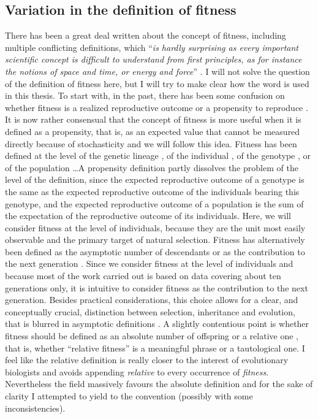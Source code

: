 \subsection{Variation in the definition of fitness}
There has been a great deal written about the concept of fitness, including multiple conflicting definitions, which ``\emph{is hardly surprising as every important scientific concept is difficult to understand from first principles, as for instance the notions of space and time, or energy and force}'' \parencite[p. 1358][]{Wagner2010}. I will not solve the question of the definition of fitness here, but I will try to make clear how the word is used in this thesis. To start with, in the past, there has been some confusion on whether fitness is a realized reproductive outcome or a propensity to reproduce \parencite{Brandon1984}. It is now rather consensual that the concept of fitness is more useful when it is defined as a propensity, that is, as an expected value that cannot be measured directly because of stochasticity \parencite{Brandon1984,Price1996,Krimbas2004} and we will follow this idea. Fitness has been defined at the level of the genetic lineage \parencite[e.g.][]{Akc2016}, of the individual \parencite[e.g.][]{Cam2000}, of the genotype \parencite[e.g.][]{Steiner2012}, or of the population \parencite[e.g.][]{vanTienderen2000}\dots A propensity definition partly dissolves the problem of the level of the definition, since the expected reproductive outcome of a genotype is the same as the expected reproductive outcome of the individuals bearing this genotype, and the expected reproductive outcome of a population is the sum of the expectation of the reproductive outcome of its individuals. Here, we will consider fitness at the level of individuals, because they are the unit most easily observable and the primary target of natural selection.
Fitness has alternatively been defined as the asymptotic number of descendants or as the contribution to the next generation \parencite{Wade2006}. Since we consider fitness at the level of individuals and because most of the work carried out is based on data covering about ten generations only, it is intuitive to consider fitness as the contribution to the next generation. Besides practical considerations, this choice allows for a clear, and conceptually crucial, distinction between selection, inheritance and evolution, that is blurred in asymptotic definitions \parencite{Fisher1930, Arnold1984}. 
A slightly contentious point is whether fitness should be defined as an absolute number of offspring \parencite{Wade2006} or a relative one \parencite{Rousset2004}, that is, whether ``relative fitness'' is a meaningful phrase or a tautological one. I feel like the relative definition is really closer to the interest of evolutionary biologists and avoids appending \emph{relative} to every occurrence of \emph{fitness}. Nevertheless the field massively favours the absolute definition and for the sake of clarity I attempted to yield to the convention (possibly with some inconsistencies). 
